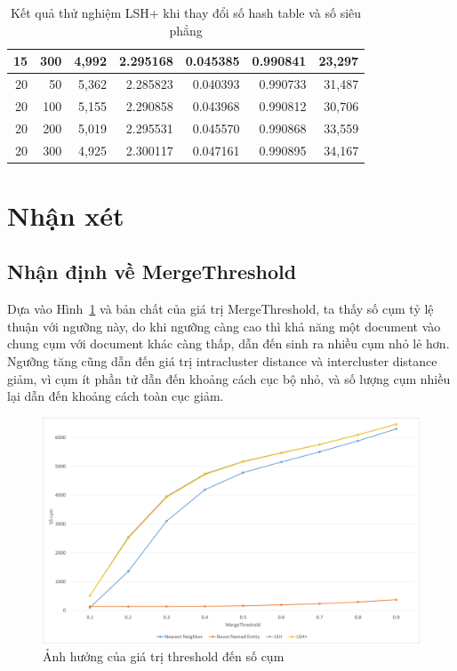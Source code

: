 \begin{table}
\begin{tabular}{|r|r|r|r|r|r|r|}
				\hline
				15            & 300           & 4,992         & 2.295168      & 0.045385      & 0.990841      & 23,297 \bigstrut\\
				\hline
				20            & 50            & 5,362         & 2.285823      & 0.040393      & 0.990733      & 31,487 \bigstrut\\
				\hline
				20            & 100           & 5,155         & 2.290858      & 0.043968      & 0.990812      & 30,706 \bigstrut\\
				\hline
				20            & 200           & 5,019         & 2.295531      & 0.045570      & 0.990868      & 33,559 \bigstrut\\
				\hline
				20            & 300           & 4,925         & 2.300117      & 0.047161      & 0.990895      & 34,167 \bigstrut\\
				\hline
			\end{tabular}%
			\caption{Kết quả thử nghiệm LSH+ khi thay đổi số hash table và số siêu phẳng }
			\label{tab:LSHParams}%
		\end{table}%
		
\section{Nhận xét}
	\subsection{Nhận định về MergeThreshold}
	Dựa vào Hình~\ref{fig:thresholdvsclustercount} và bản chất của giá trị MergeThreshold, ta thấy số cụm tỷ lệ thuận với ngưỡng này, do khi ngưỡng càng cao thì khả năng một document vào chung cụm với document khác càng thấp, dẫn đến sinh ra nhiều cụm nhỏ lẻ hơn. Ngưỡng tăng cũng dẫn đến giá trị intracluster distance và intercluster distance giảm, vì cụm ít phần tử dẫn đến khoảng cách cục bộ nhỏ, và số lượng cụm nhiều lại dẫn đến khoảng cách toàn cục giảm.
		\begin{figure}
			\centering
			\includegraphics[width=1\linewidth]{Chapter4/Chapter4Figs/ThresholdVsClusterCount}
			\caption{Ảnh hưởng của giá trị threshold đến số cụm}
			\label{fig:thresholdvsclustercount}
		\end{figure}
		
